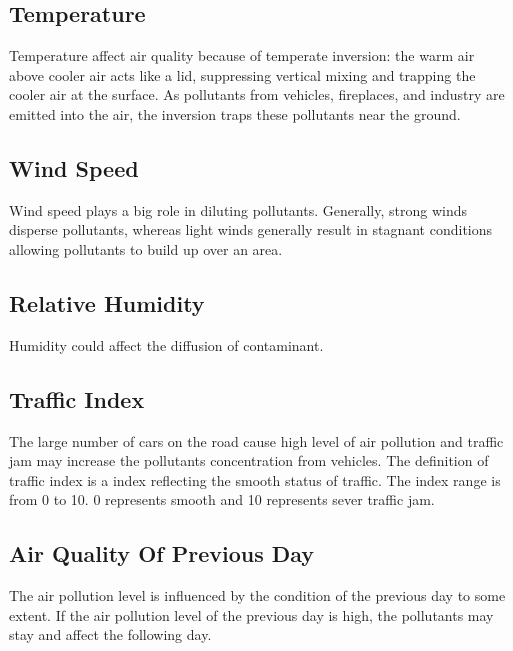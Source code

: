 \subsection{Temperature}

Temperature affect air quality because of temperate inversion: the warm air above cooler air acts like a lid, suppressing vertical mixing and trapping the cooler air at the surface. As pollutants from vehicles, fireplaces, and industry are emitted into the air, the inversion traps these pollutants near the ground.


\subsection{ Wind Speed}
Wind speed plays a big role in diluting pollutants. Generally, strong winds disperse pollutants, whereas light winds generally result in stagnant conditions allowing pollutants to build up over an area.

\subsection{ Relative Humidity}

Humidity could affect the diffusion of contaminant.

\subsection{ Traffic Index}
The large number of cars on the road cause high level of air pollution and traffic jam may increase the pollutants concentration from vehicles. The definition of traffic index is a index reflecting the smooth status of traffic. The index range is from 0 to 10. 0 represents smooth and 10 represents sever traffic jam.


\subsection{Air Quality Of Previous Day }
The air pollution level is influenced by the condition of the previous day to some extent. If the air pollution level of the previous day is high, the pollutants may stay and affect the following day.


